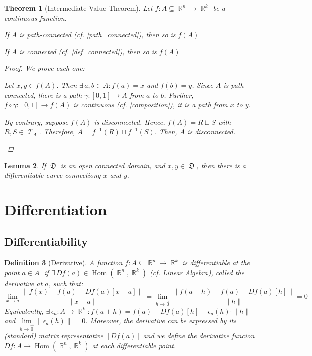 \documentclass[12pt]{article}
\let\ee\epsilon
\newcommand{\Exist}[1]{\exists\,{#1}:}
\DeclareMathOperator{\R}{\mathbb{R}}
\DeclareMathOperator{\D}{\mathfrak{D}}
\DeclareMathOperator{\T}{\mathcal{T}}
\DeclareMathOperator{\Hom}{Hom}
\newtheorem{theorem}{Theorem}[subsection]
\newtheorem{definition}[theorem]{Definition}
\newtheorem{lemma}[theorem]{Lemma}
\begin{document}
\begin{theorem}[Intermediate Value Theorem]
  Let $f:A\subseteq\R^n\to\R^k$ be a continuous function.
  \begin{compactenum}
    \item If $A$ is path-connected (cf. \ref{path_connected}), then so is $f(A)$
    \item If $A$ is connected (cf. \ref{def_connected}), then so is $f(A)$
  \end{compactenum}
  \begin{proof}
    We prove each one:
    \begin{compactenum}
      \item Let $x,y\in f(A)$. Then $\Exist{a,b\in A}f(a)=x$ and $f(b)=y$. Since $A$ is path-connected, there is a path $\gamma:[0,1]\to A$ from $a$ to $b$. Further, $f\circ \gamma:[0,1]\to f(A)$ is continuous (cf. \ref{composition}), it is a path from $x$ to $y$.
      \item By contrary, suppose $f(A)$ is disconnected. Hence, $f(A)=R\sqcup S$ with $R,S\in\T_A$. Therefore, $A=f^{-1}(R)\sqcup f^{-1}(S)$. Then, $A$ is disconnected.
    \end{compactenum}
  \end{proof}
\end{theorem}

\begin{lemma}
  \label{diff_paths}
  If $\D$ is an open connected domain, and $x,y\in\D$, then there is a differentiable curve connectiong $x$ and $y$.
\end{lemma}

\pagebreak

\section{Differentiation}

\subsection{Differentiability}

\begin{definition}[Derivative]
  A function $f:A\subseteq\R^n\to\R^k$ is differentiable at the point $a\in A^\circ$ if $\exists\,Df(a)\in \Hom(\R^n,\R^k)$ (cf. Linear Algebra), called the derivative at $a$, such that: $$\lim_{x\to a}\frac{\|f(x)-f(a)-Df(a)[x-a]\|}{\|x-a\|}=\lim_{h\to\vec{0}}\frac{\|f(a+h)-f(a)-Df(a)[h]\|}{\|h\|}=0$$ Equivalently, $\Exist{\ee_a: A\to \R^k}f(a+h)=f(a)+Df(a)[h]+\ee_a(h)\cdot \|h\|$ and $\lim\limits_{h\to\vec{0}}\|\ee_a(h)\|=0$. Moreover, the derivative can be expressed by its (standard) matrix representative $[Df(a)]$ and we define the derivative funcion $Df: A\to\Hom(\R^n,\R^k)$ at each differentiable point.
\end{definition}
\end{document}
